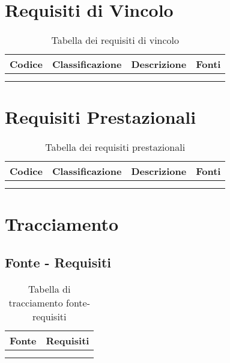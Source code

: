 \section{Requisiti di Vincolo}
\begin{table}[!ht]
  \centering
  \begin{tabular}{|c|c|c|c|}
    \hline
    \rowcolor[HTML]{036400}
    {\color[HTML]{FFFFFF} \textbf{Codice}} & {\color[HTML]{FFFFFF} \textbf{Classificazione}} & {\color[HTML]{FFFFFF} \textbf{Descrizione}} & {\color[HTML]{FFFFFF} \textbf{Fonti}} \\ \hline
    \rowcolor[HTML]{EFEFEF}
    &  &  &  \\ \hline
    \rowcolor[HTML]{C0C0C0}
    &  &  &  \\ \hline
  \end{tabular}
  \caption{Tabella dei requisiti di vincolo}
\end{table}

\section{Requisiti Prestazionali}
\begin{table}[!ht]
  \centering
  \begin{tabular}{|c|c|c|c|}
    \hline
    \rowcolor[HTML]{036400}
    {\color[HTML]{FFFFFF} \textbf{Codice}} & {\color[HTML]{FFFFFF} \textbf{Classificazione}} & {\color[HTML]{FFFFFF} \textbf{Descrizione}} & {\color[HTML]{FFFFFF} \textbf{Fonti}} \\ \hline
    \rowcolor[HTML]{EFEFEF}
    &  &  &  \\ \hline
    \rowcolor[HTML]{C0C0C0}
    &  &  &  \\ \hline
  \end{tabular}
  \caption{Tabella dei requisiti prestazionali}
\end{table}

\section{Tracciamento}

\subsection{Fonte - Requisiti}
\begin{table}[!ht]
  \centering
  \begin{tabular}{|c|c|}
    \hline
    \rowcolor[HTML]{036400}
    {\color[HTML]{FFFFFF} Fonte} & {\color[HTML]{FFFFFF} Requisiti} \\ \hline
    \rowcolor[HTML]{EFEFEF}
    &  \\ \hline
    \rowcolor[HTML]{C0C0C0}
    &  \\ \hline
  \end{tabular}
  \caption{Tabella di tracciamento fonte-requisiti}
\end{table}

